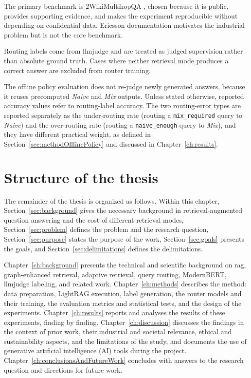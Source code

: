 \documentclass[english, bibtex]{kththesis}               %
\numberwithin{listing}{chapter}
\providecommand{\DIFaddtex}[1]{{\protect\color{blue} \sf #1}} %
\providecommand{\DIFaddbegin}{} %
\providecommand{\DIFaddend}{} %
\providecommand{\DIFadd}[1]{\texorpdfstring{\DIFaddtex{#1}}{#1}} %
\begin{document}
The primary benchmark is 2WikiMultihopQA \cite{ho2020twowiki}, chosen because it is public, provides supporting evidence, and makes the experiment reproducible without depending on confidential data. Ericsson documentation motivates the industrial problem but is not the core benchmark.

Routing labels come from \gls{llmjudge} and are treated as judged supervision rather than absolute ground truth. Cases where neither retrieval mode produces a correct answer are excluded from router training.

The offline policy evaluation does not re-judge newly generated answers, because it reuses precomputed \emph{Naive} and \emph{Mix} outputs. Unless stated otherwise, reported accuracy values refer to routing-label accuracy. The two routing-error types are reported separately as the under-routing rate (routing a \texttt{mix\_required} query to \emph{Naive}) and the over-routing rate (routing a \texttt{naive\_enough} query to \emph{Mix}), and they have different practical weight, as defined in Section~\ref{sec:methodOfflinePolicy} and discussed in Chapter~\ref{ch:results}.

\section{Structure of the thesis}
\label{sec:structure}

The remainder of the thesis is organized as follows. Within this chapter, Section~\ref{sec:background} gives the necessary background in retrieval-augmented question answering and the cost of different retrieval modes, Section~\ref{sec:problem} defines the problem and the research question, Section~\ref{sec:purpose} states the purpose of the work, Section~\ref{sec:goals} presents the goals, and Section~\ref{sec:delimitations} defines the delimitations.

Chapter~\ref{ch:background} presents the technical and scientific background on \gls{rag}, graph-enhanced retrieval, adaptive retrieval, query routing, ModernBERT, \DIFaddbegin \DIFadd{\gls{llmjudge} labeling, }\DIFaddend and related work. Chapter~\ref{ch:methods} describes the method: data preparation, LightRAG execution, label generation, the router models and their training, the evaluation metrics and statistical tests, and the design of the experiments. Chapter~\ref{ch:results} reports and analyses the results of these experiments, finding by finding. Chapter~\ref{ch:discussion} discusses the findings in the context of prior work, their industrial and societal relevance, ethical and sustainability aspects, and the limitations of the study, and documents the use of generative artificial intelligence (AI) tools during the project. Chapter~\ref{ch:conclusionsAndFutureWork} concludes with answers to the research question and directions for future work.
\end{document}
